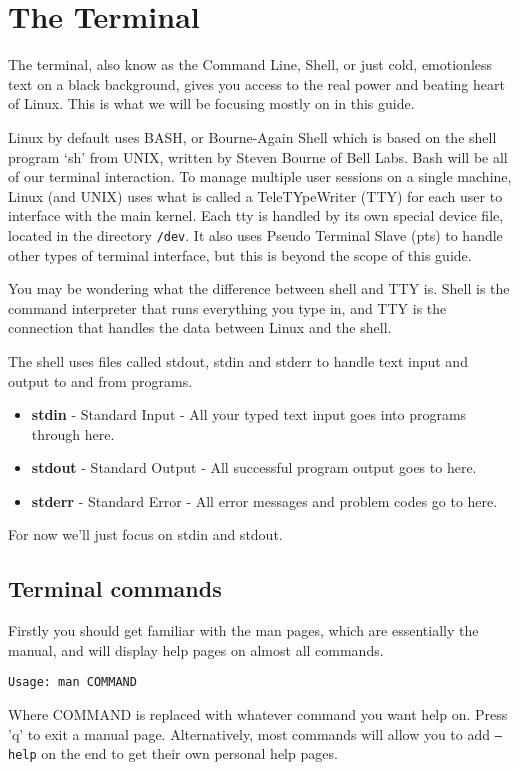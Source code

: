 \documentclass{article}
\begin{document}
\section{The Terminal}
The terminal, also know as the Command Line, Shell, or just cold, emotionless text on a black background, gives you access to the real power and beating heart of Linux. This is what we will be focusing mostly on in this guide. 

Linux by default uses BASH, or Bourne-Again Shell which is based on the shell program `sh' from UNIX, written by Steven Bourne of Bell Labs. Bash will be all of our terminal interaction. To manage multiple user sessions on a single machine, Linux (and UNIX) uses what is called a TeleTYpeWriter (TTY) for each user to interface with the main kernel. Each tty is handled by its own special device file, located in the directory \texttt{/dev}. It also uses Pseudo Terminal Slave (pts) to handle other types of terminal interface, but this is beyond the scope of this guide.

You may be wondering what the difference between shell and TTY is. Shell is the command interpreter that runs everything you type in, and TTY is the connection that handles the data between Linux and the shell.

The shell uses files called stdout, stdin and stderr to handle text input and output to and from programs.

\begin{itemize}
\item \textbf{stdin} - Standard Input - All your typed text input goes into programs through here.
\item \textbf{stdout} - Standard Output - All successful program output goes to here.
\item \textbf{stderr} - Standard Error - All error messages and problem codes go to here. 
\end{itemize}
For now we'll just focus on stdin and stdout.

\subsection{Terminal commands}
Firstly you should get familiar with the man pages, which are essentially the manual, and will display help pages on almost all commands.
\begin{verbatim}
Usage: man COMMAND
\end{verbatim}
Where COMMAND is replaced with whatever command you want help on. Press 'q' to exit a manual page. Alternatively, most commands will allow you to add \texttt{--help} on the end to get their own personal help pages.
\end{document}
